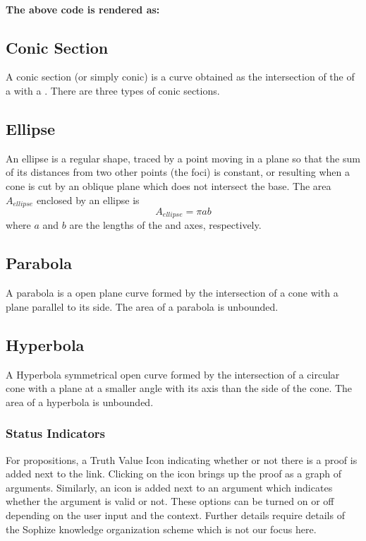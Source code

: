 \documentclass[a4paper]{article}
\begin{document}
\paragraph{The above code is rendered as:}
\begin{mdframed}
\section*{Conic Section}
A conic section (or simply conic) is a curve obtained as the intersection of the  of a  with a . There are three types of conic sections.

\subsection*{Ellipse}
An ellipse is a regular  shape, traced by a point moving in a plane so that the sum of its distances from two other points (the foci) is constant, or resulting when a cone is cut by an oblique plane which does not intersect the base.  The area $A_{ellipse}$ enclosed by an ellipse is $$A_{ellipse} = \pi a b$$where $a$ and $b$ are the lengths of the  and  axes, respectively.

\subsection*{Parabola}
A parabola is a  open plane curve formed by the intersection of a cone with a plane parallel to its side. The area of a parabola is unbounded.


\subsection*{Hyperbola}
A Hyperbola symmetrical open curve formed by the intersection of a circular cone with a plane at a smaller angle with its axis than the side of the cone. The area of a hyperbola is unbounded.

\end{mdframed}

\subsubsection{Status Indicators}

For propositions, a Truth Value Icon indicating whether or not there is a proof is added next to the link. Clicking on the icon brings up the proof as a graph of arguments. Similarly, an icon is added next to an argument which indicates whether the argument is valid or not. These options can be turned on or off depending on the user input and the context. Further details require details of the Sophize knowledge organization scheme which is not our focus here.
\end{document}
